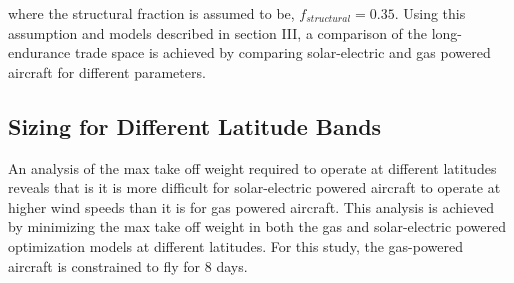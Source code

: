 \documentclass[]{aiaa-tc}%
\begin{document}
where the structural fraction is assumed to be, $f_{structural} = 0.35$. Using this assumption and models described in section III, a comparison of the long-endurance trade space is achieved by comparing solar-electric and gas powered aircraft for different parameters. 



\subsection{Sizing for Different Latitude Bands}

An analysis of the max take off weight required to operate at different latitudes reveals that is it is more difficult for solar-electric powered aircraft to operate at higher wind speeds than it is for gas powered aircraft.
This analysis is achieved by minimizing the max take off weight in both the gas and solar-electric powered optimization models at different latitudes. 
For this study, the gas-powered aircraft is constrained to fly for 8 days. 
\end{document}
